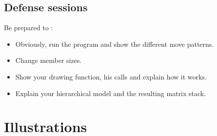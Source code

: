 \documentclass{42}
\begin{document}
\section{Defense sessions}

Be prepared to :\\
\begin{itemize}
	\item Obviously, run the program and show the different move patterns.
	\item Change member sizes.
	\item Show your drawing function, his calls and explain how it works.
	\item Explain your hierarchical model and the resulting matrix stack.
\end{itemize}

\chapter{Illustrations}

\end{document}
